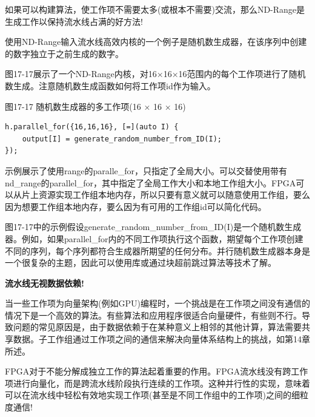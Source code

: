 \begin{tcolorbox}[colback=red!5!white,colframe=red!75!black]
如果可以构建算法，使工作项不需要太多(或根本不需要)交流，那么ND-Range是生成工作以保持流水线占满的好方法!
\end{tcolorbox}

使用ND-Range输入流水线高效内核的一个例子是随机数生成器，在该序列中创建的数字独立于之前生成的数字。\par

图17-17展示了一个ND-Range内核，对16×16×16范围内的每个工作项进行了随机数生成。注意随机数生成函数如何将工作项id作为输入。\par

\hspace*{\fill} \par %
图17-17 随机数生成器的多工作项(16 × 16 × 16)
\begin{lstlisting}[caption={}]
h.parallel_for({16,16,16}, [=](auto I) {
	output[I] = generate_random_number_from_ID(I);
});
\end{lstlisting}

示例展示了使用range的paralle\_for，只指定了全局大小。可以交替使用带有nd\_range的parallel\_for，其中指定了全局工作大小和本地工作组大小。FPGA可以从片上资源实现工作组本地内存，所以只要有意义就可以随意使用工作组，要么因为想要工作组本地内存，要么因为有可用的工作组id可以简化代码。\par

\begin{tcolorbox}[colback=blue!5!white,colframe=blue!75!black, title=并行随机数生成器]
图17-17中的示例假设generate\_random\_number\_from\_ID(I)是一个随机数生成器。例如，如果parallel\_for内的不同工作项执行这个函数，期望每个工作项创建不同的序列，每个序列都符合生成器所期望的任何分布。并行随机数生成器本身是一个很复杂的主题，因此可以使用库或通过块超前跳过算法等技术了解。
\end{tcolorbox}

\hspace*{\fill} \par %
\textbf{流水线无视数据依赖!}

当一些工作项为向量架构(例如GPU)编程时，一个挑战是在工作项之间没有通信的情况下是一个高效的算法。有些算法和应用程序很适合向量硬件，有些则不行。导致问题的常见原因是，由于数据依赖于在某种意义上相邻的其他计算，算法需要共享数据。子工作组通过工作项之间的通信来解决向量体系结构上的挑战，如第14章所述。\par

FPGA对于不能分解成独立工作的算法起着重要的作用。FPGA流水线没有跨工作项进行向量化，而是跨流水线阶段执行连续的工作项。这种并行性的实现，意味着可以在流水线中轻松有效地实现工作项(甚至是不同工作组中的工作项)之间的细粒度通信!\par

